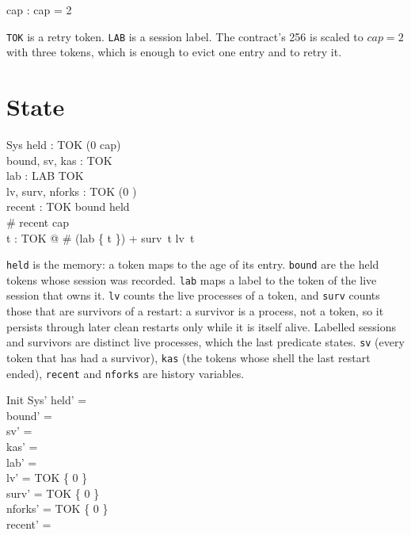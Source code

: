 \documentclass[a4paper,10pt,fleqn]{article}
\begin{document}
\begin{axdef}
  cap : \nat
\where
  cap = 2
\end{axdef}

\texttt{TOK} is a retry token.  \texttt{LAB} is a session label.  The
contract's 256 is scaled to $cap = 2$ with three tokens, which is enough to
evict one entry and to retry it.

\section{State}

\begin{schema}{Sys}
  held : TOK \pfun (0 \upto cap) \\
  bound, sv, kas : \power TOK \\
  lab : LAB \pfun TOK \\
  lv, surv, nforks : TOK \fun (0 ) \\
  recent : \seq TOK
\where
  bound \subseteq \dom held \\
  \# recent \leq cap \\
  \forall t : TOK @ \# (lab \rres \{ t \}) + surv~t \leq lv~t
\end{schema}

\texttt{held} is the memory: a token maps to the age of its entry.
\texttt{bound} are the held tokens whose session was recorded.  \texttt{lab}
maps a label to the token of the live session that owns it.  \texttt{lv} counts
the live processes of a token, and \texttt{surv} counts those that are
survivors of a restart: a survivor is a process, not a token, so it persists
through later clean restarts only while it is itself alive.  Labelled sessions
and survivors are distinct live processes, which the last predicate states.
\texttt{sv} (every token that has had a survivor), \texttt{kas} (the tokens whose shell the last restart ended), \texttt{recent} and
\texttt{nforks} are history variables.

\begin{schema}{Init}
  Sys'
\where
  held' = \emptyset \\
  bound' = \emptyset \\
  sv' = \emptyset \\
  kas' = \emptyset \\
  lab' = \emptyset \\
  lv' = TOK \cross \{ 0 \} \\
  surv' = TOK \cross \{ 0 \} \\
  nforks' = TOK \cross \{ 0 \} \\
  recent' = \langle \rangle
\end{schema}
\end{document}
